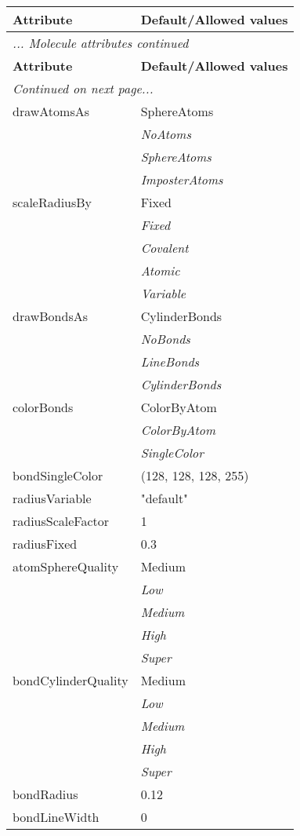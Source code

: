 \documentclass[10pt,a4paper]{report}
\begin{document}
\begin{longtable}{ll}
{\bf Attribute} & {\bf Default/Allowed values} \\
\hline \hline
\endfirsthead
\multicolumn{2}{l}{{\it ... Molecule attributes continued}} \\
{\bf Attribute} & {\bf Default/Allowed values} \\
\hline \hline
\endhead
\hline
\multicolumn{2}{l}{{\it Continued on next page...}} \\
\endfoot
\hline
\endlastfoot

drawAtomsAs  &  SphereAtoms   \\
 & {\it  NoAtoms} \\
 & {\it  SphereAtoms} \\
 & {\it  ImposterAtoms} \\
scaleRadiusBy  &  Fixed   \\
 & {\it  Fixed} \\
 & {\it  Covalent} \\
 & {\it  Atomic} \\
 & {\it  Variable} \\
drawBondsAs  &  CylinderBonds   \\
 & {\it  NoBonds} \\
 & {\it  LineBonds} \\
 & {\it  CylinderBonds} \\
colorBonds  &  ColorByAtom   \\
 & {\it  ColorByAtom} \\
 & {\it  SingleColor} \\
bondSingleColor  &  (128, 128, 128, 255) \\
radiusVariable  &  "default" \\
radiusScaleFactor  &  1 \\
radiusFixed  &  0.3 \\
atomSphereQuality  &  Medium   \\
 & {\it  Low} \\
 & {\it  Medium} \\
 & {\it  High} \\
 & {\it  Super} \\
bondCylinderQuality  &  Medium   \\
 & {\it  Low} \\
 & {\it  Medium} \\
 & {\it  High} \\
 & {\it  Super} \\
bondRadius  &  0.12 \\
bondLineWidth  &  0 \\

\end{longtable}
\end{document}
